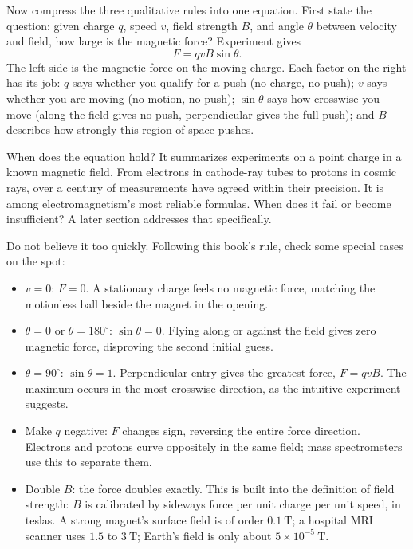 \begin{mainline}
Now compress the three qualitative rules into one equation. First state the question: given charge \(q\), speed \(v\), field strength \(B\), and angle \(\theta\) between velocity and field, how large is the magnetic force? Experiment gives
\[
F=qvB\sin\theta .
\]
The left side is the magnetic force on the moving charge. Each factor on the right has its job: \(q\) says whether you qualify for a push (no charge, no push); \(v\) says whether you are moving (no motion, no push); \(\sin\theta\) says how crosswise you move (along the field gives no push, perpendicular gives the full push); and \(B\) describes how strongly this region of space pushes.

When does the equation hold? It summarizes experiments on a point charge in a known magnetic field. From electrons in cathode-ray tubes to protons in cosmic rays, over a century of measurements have agreed within their precision. It is among electromagnetism's most reliable formulas. When does it fail or become insufficient? A later section addresses that specifically.

Do not believe it too quickly. Following this book's rule, check some special cases on the spot:

\begin{itemize}
  \item \(v=0\): \(F=0\). A stationary charge feels no magnetic force, matching the motionless ball beside the magnet in the opening.
  \item \(\theta=0\) or \(\theta=180^\circ\): \(\sin\theta=0\). Flying along or against the field gives zero magnetic force, disproving the second initial guess.
  \item \(\theta=90^\circ\): \(\sin\theta=1\). Perpendicular entry gives the greatest force, \(F=qvB\). The maximum occurs in the most crosswise direction, as the intuitive experiment suggests.
  \item Make \(q\) negative: \(F\) changes sign, reversing the entire force direction. Electrons and protons curve oppositely in the same field; mass spectrometers use this to separate them.
  \item Double \(B\): the force doubles exactly. This is built into the definition of field strength: \(B\) is calibrated by sideways force per unit charge per unit speed, in teslas. A strong magnet's surface field is of order \(0.1\ \mathrm T\); a hospital MRI scanner uses \(1.5\) to \(3\ \mathrm T\); Earth's field is only about \(5\times10^{-5}\ \mathrm T\).
\end{itemize}


\end{mainline}
